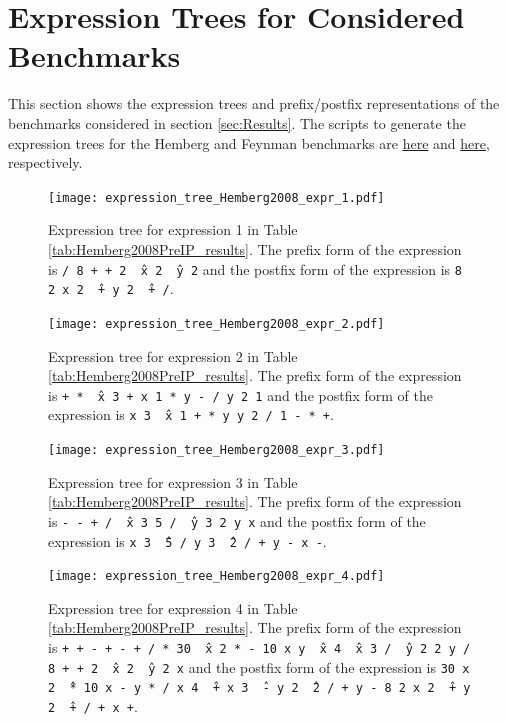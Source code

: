 \documentclass[12pt]{iopart}
\begin{document}
\section{Expression Trees for Considered Benchmarks} %
This section shows the expression trees and prefix/postfix representations of the benchmarks considered in section \ref{sec:Results}. The scripts to generate the expression trees for the Hemberg and Feynman benchmarks are \href{https://github.com/edfink234/Alpha-Zero-Symbolic-Regression/blob/b57363c6bf1b79cda6e220ebec7c05387e2db971/visualize_tree.py}{here} and \href{https://github.com/edfink234/Alpha-Zero-Symbolic-Regression/blob/b57363c6bf1b79cda6e220ebec7c05387e2db971/AIFeynman.py}{here}, respectively. 

\begin{figure}
    \centering
    \texttt{[image: expression\_tree\_Hemberg2008\_expr\_1.pdf]}
    \caption{Expression tree for expression 1 in Table \ref{tab:Hemberg2008PreIP_results}. The prefix form of the expression is \texttt{/ 8 + + 2 \^\ x 2 \^\ y 2} and the postfix form of the expression is \texttt{8 2 x 2 \^\ + y 2 \^\ + /}. }
    \label{fig:expression_tree_Hemberg2008_expr_1}
\end{figure}

\begin{figure}
    \centering
    \texttt{[image: expression\_tree\_Hemberg2008\_expr\_2.pdf]}
    \caption{Expression tree for expression 2 in Table \ref{tab:Hemberg2008PreIP_results}. The prefix form of the expression is \texttt{+ * \^\ x 3 + x 1 * y - / y 2 1} and the postfix form of the expression is \texttt{x 3 \^\ x 1 + * y y 2 / 1 - * +}. } 
    \label{fig:expression_tree_Hemberg2008_expr_2}
\end{figure}

\begin{figure}
    \centering
    \texttt{[image: expression\_tree\_Hemberg2008\_expr\_3.pdf]}
    \caption{Expression tree for expression 3 in Table \ref{tab:Hemberg2008PreIP_results}. The prefix form of the expression is \texttt{- - + / \^\ x 3 5 / \^\ y 3 2 y x} and the postfix form of the expression is \texttt{x 3 \^\ 5 / y 3 \^\ 2 / + y - x -}. } 
    \label{fig:expression_tree_Hemberg2008_expr_3}
\end{figure}

\begin{figure}
    \centering
    \texttt{[image: expression\_tree\_Hemberg2008\_expr\_4.pdf]}
    \caption{Expression tree for expression 4 in Table \ref{tab:Hemberg2008PreIP_results}.  The prefix form of the expression is \texttt{+ + - + - + / * 30 \^\ x 2 * - 10 x y \^\ x 4 \^\ x 3 / \^\ y 2 2 y / 8 + + 2 \^\ x 2 \^\ y 2 x} and the postfix form of the expression is \texttt{30 x 2 \^\ * 10 x - y * / x 4 \^\ + x 3 \^\ - y 2 \^\ 2 / + y - 8 2 x 2 \^\ + y 2 \^\ + / + x +}. } 
    \label{fig:expression_tree_Hemberg2008_expr_4}
\end{figure}
\end{document}
